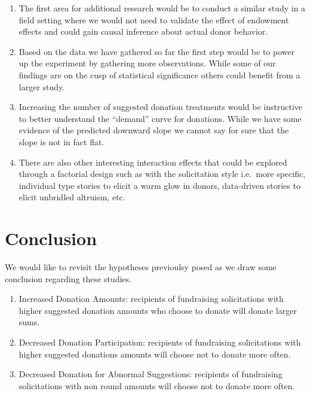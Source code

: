 \documentclass[]{article}
\providecommand{\tightlist}{%
  \setlength{\itemsep}{0pt}\setlength{\parskip}{0pt}}
\begin{document}
\begin{enumerate}
\def\labelenumi{\arabic{enumi}.}
\tightlist
\item
  The first area for additional research would be to conduct a similar
  study in a field setting where we would not need to validate the
  effect of endowment effects and could gain causal inference about
  actual donor behavior.
\item
  Based on the data we have gathered so far the first step would be to
  power up the experiment by gathering more observations. While some of
  our findings are on the cusp of statistical significance others could
  benefit from a larger study.
\item
  Increasing the number of suggested donation treatments would be
  instructive to better understand the ``demand'' curve for donations.
  While we have some evidence of the predicted downward slope we cannot
  say for sure that the slope is not in fact flat.
\item
  There are also other interesting interaction effects that could be
  explored through a factorial design such as with the solicitation
  style i.e.~more specific, individual type stories to elicit a warm
  glow in donors, data-driven stories to elicit unbridled altruism, etc.
\end{enumerate}

\section{Conclusion}\label{conclusion}

We would like to revisit the hypotheses previoulsy posed as we draw some
conclusion regarding these studies.

\begin{enumerate}
\def\labelenumi{\arabic{enumi}.}
\tightlist
\item
  Increased Donation Amounts: recipients of fundraising solicitations
  with higher suggested donation amounts who choose to donate will
  donate larger sums.
\item
  Decreased Donation Participation: recipients of fundraising
  solicitations with higher suggested donations amounts will choose not
  to donate more often.
\item
  Decreased Donation for Abnormal Suggestions: recipients of fundraising
  solicitations with non round amounts will choose not to donate more
  often.
\end{enumerate}
\end{document}

